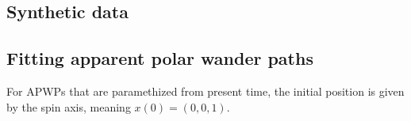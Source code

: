\subsection{Synthetic data}

\subsection{Fitting apparent polar wander paths}

For APWPs that are paramethized from present time, the initial position is given by the spin axis, meaning $x(0) = (0,0,1)$. 